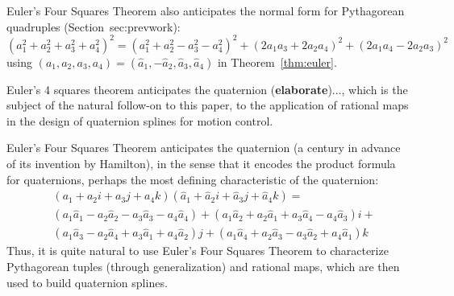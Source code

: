 \documentclass[11pt]{article}
\begin{document}
\begin{rmk}
Euler's Four Squares Theorem also anticipates the normal form
for Pythagorean quadruples (Section~{sec:prevwork}):
\begin{equation}
\label{eq:euler1}
(a_1^2 + a_2^2 + a_3^2 + a_4^2)^2 = 
(a_1^2 + a_2^2 - a_3^2 - a_4^2)^2 + (2a_1a_3+2a_2a_4)^2 + (2a_1a_4-2a_2a_3)^2
\end{equation}
using $(a_1,a_2,a_3,a_4) = (\hat{a}_1,-\hat{a}_2,\hat{a}_3,\hat{a}_4)$ in 
Theorem~\ref{thm:euler}.
\end{rmk}

Euler's 4 squares theorem anticipates the quaternion ({\bf elaborate})...,
which is the subject of the natural follow-on to this paper, 
to the application of rational maps in the design of quaternion splines
for motion control.

\begin{rmk}
Euler's Four Squares Theorem anticipates
the quaternion (a century in advance of its invention by Hamilton),
in the sense that it encodes the product formula for quaternions,
perhaps the most defining characteristic of the quaternion:
\[
\begin{array}{ll}
& (a_1 + a_2 i + a_3 j + a_4 k) 
(\hat{a}_1 + \hat{a}_2 i + \hat{a}_3 j + \hat{a}_4 k) = \\
& (a_1 \hat{a}_1 - a_2\hat{a}_2 - a_3\hat{a}_3 - a_4\hat{a}_4) +
   (a_1\hat{a}_2 + a_2\hat{a}_1 + a_3\hat{a}_4 - a_4\hat{a}_3) i + \\
&  (a_1\hat{a}_3 - a_2\hat{a}_4 + a_3\hat{a}_1 + a_4\hat{a}_2) j +
   (a_1\hat{a}_4 + a_2\hat{a}_3 - a_3\hat{a}_2 + a_4\hat{a}_1) k
\end{array}
\]
Thus, it is quite natural to use Euler's Four Squares Theorem
to characterize Pythagorean tuples (through generalization) and rational maps, 
which are then used to build quaternion splines.
\end{rmk}
\end{document}
